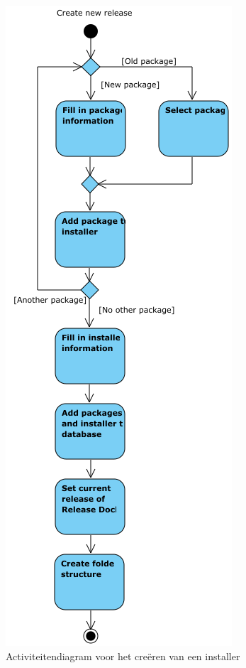 \begin{figure}[!ht]
\centering
\includegraphics[scale=0.8]{afbeelding/flowcharts/NewRelease.png}
\caption{Activiteitendiagram voor het creëren van een installer}
\label{fig:flow:newRelease}
\end{figure}

